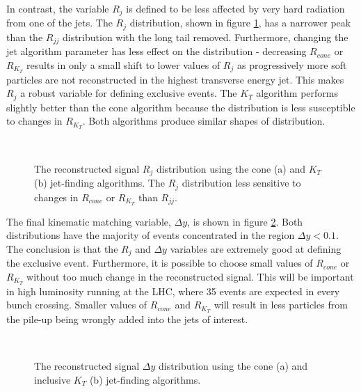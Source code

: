 In contrast, the variable $R_j$ is defined to be less affected by very hard radiation from one of the jets.
The $R_j$ distribution, shown in figure \ref{higgsrj}, has a narrower peak than the $R_{jj}$ distribution with the long tail removed. Furthermore, changing the jet algorithm parameter has less effect on the distribution -  decreasing $R_{cone}$ or $R_{K_T}$ results in only a small shift to lower values of $R_j$ as progressively more soft particles are not reconstructed in the highest transverse energy jet. This makes $R_j$ a robust variable for defining exclusive events. The $K_T$ algorithm performs slightly better than the cone algorithm because the distribution is less susceptible to changes in $R_{K_T}$. Both algorithms produce similar shapes of distribution.


\begin{figure} 
\centering
\mbox{
	\quad
	}
\caption[The effect of the cone and $K_T$ algorithms on the signal $R_{j}$ distribution]{The reconstructed signal $R_{j}$ distribution using the cone (a) and $K_T$ (b) jet-finding algorithms. The $R_j$ distribution less sensitive to changes in $R_{cone}$ or $R_{K_T}$ than $R_{jj}$. \label{higgsrj}}
\end{figure}


The final kinematic matching variable, $\Delta y$, is shown in figure \ref{higgsdeltay}.  Both distributions have the majority of events concentrated in the region $\Delta y < 0.1$. The conclusion is that the $R_j$ and $\Delta y$ variables are extremely good at defining the exclusive event. Furthermore, it is possible to choose small values of $R_{cone}$ or $R_{K_T}$ without too much change in the reconstructed signal. This will be important in high luminosity running at the LHC, where 35 events are expected in every bunch crossing. Smaller values of $R_{cone}$ and $R_{K_T}$ will result in less particles from the pile-up being wrongly added into the jets of interest.

\begin{figure} 
\centering
	\mbox{
	}
\caption[The effect of the cone and $K_T$ algorithms on the signal $\Delta y$ distribution]{The reconstructed signal $\Delta y$ distribution using the cone (a) and inclusive $K_T$ (b) jet-finding algorithms.\label{higgsdeltay}}
\end{figure}

